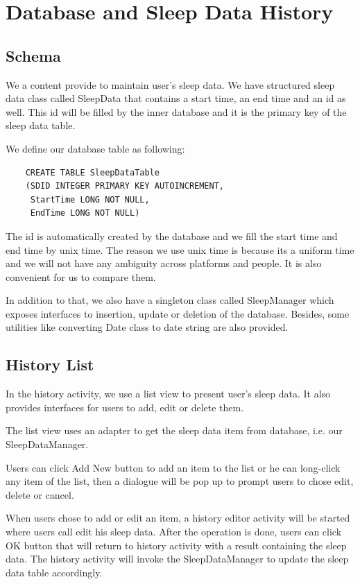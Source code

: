 \documentclass[14pt]{extreport}
\begin{document}
\chapter{Database and Sleep Data History}

\section{Schema}
We a content provide to maintain user's sleep data. We have structured sleep data class called SleepData that contains a start time, an end time and an id as well. This id will be filled by the inner database and it is the primary key of the sleep data table.

We define our database table as following:
\begin{verbatim}
    CREATE TABLE SleepDataTable
    (SDID INTEGER PRIMARY KEY AUTOINCREMENT, 
     StartTime LONG NOT NULL,
     EndTime LONG NOT NULL)
\end{verbatim}
The id is automatically created by the database and we fill the start time and end time by unix time. The reason we use unix time is because its a uniform time and we will not have any ambiguity across platforms and people. It is also convenient for us to compare them.

In addition to that, we also have a singleton class called SleepManager which exposes interfaces to insertion, update or deletion of the database. Besides, some utilities like converting Date class to date string are also provided.

\section{History List}
In the history activity, we use a list view to present user's sleep data. It also provides interfaces for users to add, edit or delete them.

The list view uses an adapter to get the sleep data item from database, i.e. our SleepDataManager.

Users can click Add New button to add an item to the list or he can long-click any item of the list, then a dialogue will be pop up to prompt users to chose edit, delete or cancel. 

When users chose to add or edit an item, a history editor activity will be started where users call edit his sleep data. After the operation is done, users can click OK button that will return to history activity with a result containing the sleep data. The history activity will invoke the SleepDataManager to update the sleep data table accordingly. 
\end{document}
